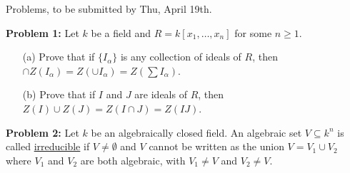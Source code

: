 \documentclass[12pt]{article}
\begin{document}
\skv
\skv
\bf\centerline{Problems, to be submitted by Thu, April 19th. }\rm
\skv
{\bf Problem 1:} Let $k$ be a field and $R=k[x_1,\ldots, x_n]$ for some $n\geq 1$.
\begin{itemize}
\item[(a)] Prove that if $\{I_{\alpha}\}$ is any collection of ideals of $R$, then
$\cap Z(I_{\alpha})=Z(\cup I_{\alpha})=Z(\sum I_{\alpha})$.
\item[(b)] Prove that if $I$ and $J$ are ideals of $R$, then
$Z(I)\cup Z(J)=Z(I\cap J)=Z(IJ)$.
\end{itemize}
\skv
{\bf Problem 2:} Let $k$ be an algebraically closed field.
An algebraic set $V\subseteq k^n$ is called \underline{irreducible} 
if $V\neq\emptyset$ and $V$ cannot be written as the union $V=V_1\cup V_2$ where
$V_1$ and $V_2$ are both algebraic, with $V_1\neq V$ and $V_2\neq V$.
\end{document}
